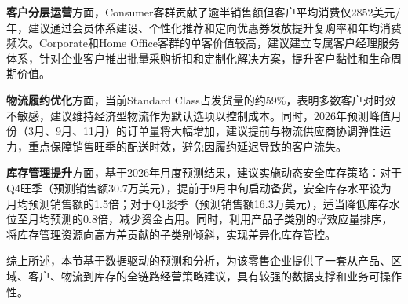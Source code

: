 \textbf{客户分层运营}方面，Consumer客群贡献了逾半销售额但客户平均消费仅2852美元/年，建议通过会员体系建设、个性化推荐和定向优惠券发放提升复购率和年均消费频次。Corporate和Home Office客群的单客价值较高，建议建立专属客户经理服务体系，针对企业客户推出批量采购折扣和定制化解决方案，提升客户黏性和生命周期价值。

\textbf{物流履约优化}方面，当前Standard Class占发货量的约59\%，表明多数客户对时效不敏感，建议维持经济型物流作为默认选项以控制成本。同时，2026年预测峰值月份（3月、9月、11月）的订单量将大幅增加，建议提前与物流供应商协调弹性运力，重点保障销售旺季的配送时效，避免因履约延迟导致的客户流失。

\textbf{库存管理提升}方面，基于2026年月度预测结果，建议实施动态安全库存策略：对于Q4旺季（预测销售额30.7万美元），提前于9月中旬启动备货，安全库存水平设为月均预测销售额的1.5倍；对于Q1淡季（预测销售额16.3万美元），适当降低库存水位至月均预测的0.8倍，减少资金占用。同时，利用产品子类别的$\eta^2$效应量排序，将库存管理资源向高方差贡献的子类别倾斜，实现差异化库存管控。

综上所述，本节基于数据驱动的预测和分析，为该零售企业提供了一套从产品、区域、客户、物流到库存的全链路经营策略建议，具有较强的数据支撑和业务可操作性。
